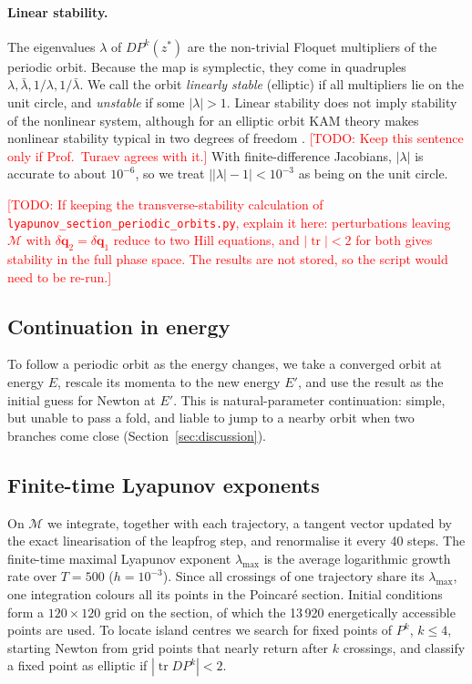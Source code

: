 \documentclass[11pt,a4paper]{article}
\newcommand{\todo}[1]{\textcolor{red}{[TODO: #1]}}
\newcommand{\q}{\mathbf{q}}
\newcommand{\M}{\mathcal{M}}
\begin{document}
\paragraph{Linear stability.}
The eigenvalues $\lambda$ of $DP^k(z^*)$ are the non-trivial Floquet
multipliers of the periodic orbit. Because the map is symplectic, they come in
quadruples $\lambda,\bar\lambda,1/\lambda,1/\bar\lambda$. We call the orbit
\emph{linearly stable} (elliptic) if all multipliers lie on the unit circle,
and \emph{unstable} if some $|\lambda|>1$. Linear stability does not imply
stability of the nonlinear system, although for an elliptic orbit KAM theory
makes nonlinear stability typical in two degrees of freedom
\cite{meiss}. \todo{Keep this sentence only if Prof.\ Turaev agrees with it.}
With finite-difference Jacobians, $|\lambda|$ is accurate to about $10^{-6}$,
so we treat $\bigl||\lambda|-1\bigr|<10^{-3}$ as being on the unit circle.

\todo{If keeping the transverse-stability calculation of
\texttt{lyapunov\_section\_periodic\_orbits.py}, explain it here:
perturbations leaving $\M$ with $\delta\q_2=\delta\q_1$ reduce to two Hill
equations, and $|\operatorname{tr}|<2$ for both gives stability in the full
phase space. The results are not stored, so the script would need to be
re-run.}

\subsection{Continuation in energy}
To follow a periodic orbit as the energy changes, we take a converged orbit at
energy $E$, rescale its momenta to the new energy $E'$, and use the result as
the initial guess for Newton at $E'$. This is natural-parameter continuation:
simple, but unable to pass a fold, and liable to jump to a nearby orbit when two
branches come close (Section~\ref{sec:discussion}).

\subsection{Finite-time Lyapunov exponents}
On $\M$ we integrate, together with each trajectory, a tangent vector updated
by the exact linearisation of the leapfrog step, and renormalise it every 40
steps. The finite-time maximal Lyapunov exponent $\lambda_{\max}$ is the
average logarithmic growth rate over $T=500$ ($h=10^{-3}$). Since all crossings
of one trajectory share its $\lambda_{\max}$, one integration colours all its
points in the Poincar\'e section. Initial conditions form a $120\times120$ grid
on the section, of which the 13\,920 energetically accessible points are used.
To locate island centres we search for fixed points of $P^k$, $k\le4$, starting
Newton from grid points that nearly return after $k$ crossings, and classify a
fixed point as elliptic if $|\operatorname{tr}DP^k|<2$.
\end{document}
